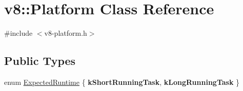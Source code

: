 \hypertarget{classv8_1_1Platform}{}\section{v8\+:\+:Platform Class Reference}
\label{classv8_1_1Platform}


{\ttfamily \#include $<$v8-\/platform.\+h$>$}

\subsection*{Public Types}
\begin{DoxyCompactItemize}
\item 
enum \hyperlink{classv8_1_1Platform_ace7f666b2b5995bb0e898e12fa660718}{Expected\+Runtime} \{ {\bfseries k\+Short\+Running\+Task}, 
{\bfseries k\+Long\+Running\+Task}
 \}
\end{DoxyCompactItemize}
